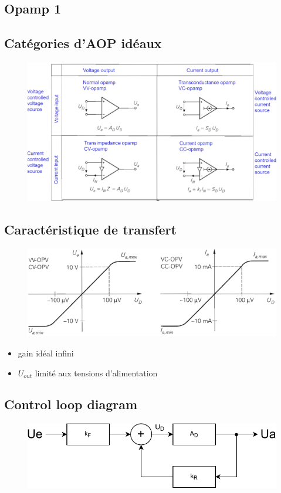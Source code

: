 \documentclass[resume]{subfiles}
\begin{document}
\begin{multicols}{3}
\section{Opamp 1}


\subsection{Catégories d'AOP idéaux}
\begin{figure}[H]
    \centering
    \includegraphics[width=0.8\columnwidth]{../images/OpAmp1/categoriesAOP.png}
\end{figure}
\subsection{Caractéristique de transfert}
\begin{figure}[H]
    \centering
    \includegraphics[width=0.8\columnwidth]{../images/OpAmp1/carTransAOP.png}
\end{figure}
\begin{itemize}
\item gain idéal infini
\item $U_{out}$ limité aux tensions d'alimentation
\end{itemize}

\subsection{Control loop diagram}
\begin{figure}[H]
    \centering
    \includegraphics[width=0.8\columnwidth, page=1]{Schemas-crop.pdf}
\end{figure}


\end{multicols}
\end{document}
